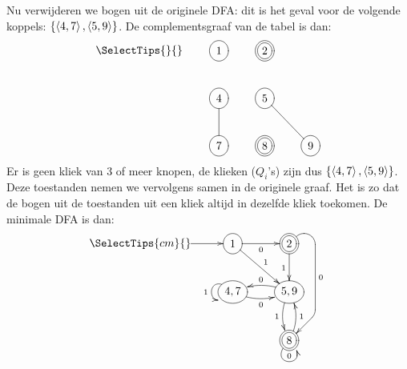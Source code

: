 \documentclass[a4paper]{article}
\begin{document}
Nu verwijderen we bogen uit de originele DFA: dit is het geval voor de volgende koppels: $\left\{ \left\langle 4,7 \right\rangle,\left\langle 5,9 \right\rangle \right\}$. De complementsgraaf van de tabel is dan:
\[  \entrymodifiers={++[o][F-]}
  \SelectTips{}{}
  \xymatrix {
    *{} &1           &*++[o][F=]{2} &*[]{}\\
    *{} &4\ar@{-}[d] &5\ar@{-}[dr]  &*[]{}\\
    *{} &7           &*++[o][F=]{8} &9\\
} \]
Er is geen kliek van $3$ of meer knopen, de klieken ($Q_i$'s) zijn dus $\left\{ \left\langle 4,7 \right\rangle,\left\langle 5,9 \right\rangle \right\}$. Deze toestanden nemen we vervolgens samen in de originele graaf. Het is zo dat de bogen uit de toestanden uit een kliek altijd in dezelfde kliek toekomen. De minimale DFA is dan:
\[  \entrymodifiers={++[o][F-]}
  \SelectTips{cm}{}
  \xymatrix {
    *{}\ar[r] &1\ar[r]_0\ar[rd]^1               &*++[o][F=]{2}\ar[d]_1\ar `ur_r[dd]`[dd]`_dl[dd]^0[dd]\\
    *{}       &{4,7}\ar@(lu,ld)[]_1\ar@/_/[r]_0 &{5,9}\ar@/_/[d]_1\ar@/_/[l]_0\\
    *{}       &*[]{}                            &*++[o][F=]{8}\ar@(ld,rd)[]^0\ar@/_/[u]_1\\
} \]
\end{document}
